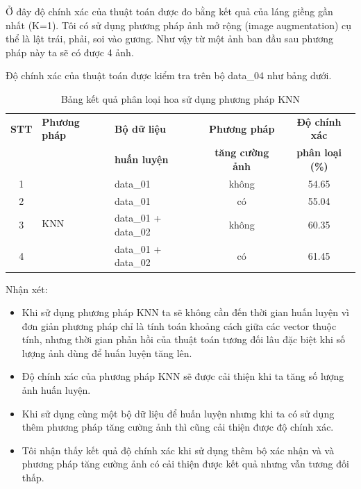 \documentclass[12pt]{report}
\begin{document}
		Ở đây độ chính xác của thuật toán được đo bằng kết quả của láng giềng gần nhất (K=1). Tôi có sử dụng phương pháp ảnh mở rộng (image augmentation) cụ thể là lật trái, phải, soi vào gương. Như vậy từ một ảnh ban đầu sau phương pháp này ta sẽ có được 4 ảnh.
						
		Độ chính xác của thuật toán được kiểm tra trên bộ data\_04 như bảng dưới.
				
		\begin{table}[h]
			\centering
			\caption{Bảng kết quả phân loại hoa sử dụng phương pháp KNN}
			\label{tbl:table ket qua cua KNN}
			\begin{tabular}{|c|l|l|c|c|}
				\hline
				\textbf{STT} & \textbf{Phương pháp} & \textbf{Bộ dữ liệu} & \textbf{Phương pháp}       & \textbf{Độ chính xác} \\ 
				             &                         & \textbf{huấn luyện}   & \textbf{tăng cường ảnh} & \textbf{phân loại (\%)} \\ \hline
				1            & \multirow{4}{*}{KNN}    & data\_01                  & không                        & 54.65                      \\ \cline{1-1} \cline{3-5}
				2            &                         & data\_01                  & có                           & 55.04                      \\ \cline{1-1}\cline{3-5}
				3            &                         & data\_01 + data\_02       & không                        & 60.35                      \\ \cline{1-1}\cline{3-5}
				4            &                         & data\_01 + data\_02       & có                           & 61.45                      \\ \hline
			\end{tabular}
		\end{table}
		Nhận xét: 		
		\begin{itemize}
			\item Khi sử dụng phương pháp KNN ta sẽ không cần đến thời gian huấn luyện vì đơn giản phương pháp chỉ là tính toán khoảng cách giữa các vector thuộc tính, nhưng thời gian phản hồi của thuật toán tương đối lâu đặc biệt khi số lượng ảnh dùng để huấn luyện tăng lên.
			\item Độ chính xác của phương pháp KNN sẽ được cải thiện khi ta tăng số lượng ảnh huấn luyện.
			\item Khi sử dụng cùng một bộ dữ liệu để huấn luyện nhưng khi ta có sử dụng thêm phương pháp tăng cường ảnh thì cũng cải thiện được độ chính xác.
			\item Tôi nhận thấy kết quả độ chính xác khi sử dụng thêm bộ xác nhận và và phương pháp tăng cường ảnh có cải thiện được kết quả nhưng vẫn tương đối thấp.
		\end{itemize}
				
\end{document}
